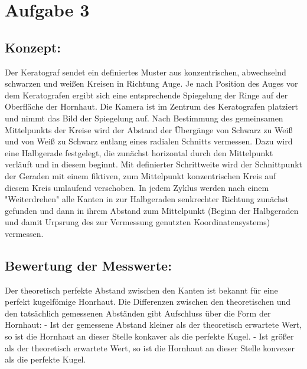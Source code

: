\documentclass{../Vorlage/sebDenCls}
\begin{document}
\section*{Aufgabe 3}

\subsection{Konzept:}
Der Keratograf sendet ein definiertes Muster aus konzentrischen, abwechselnd schwarzen und weißen Kreisen in Richtung Auge. Je nach Position des Auges vor dem Keratografen ergibt sich eine entsprechende Spiegelung der Ringe auf der Oberfläche der Hornhaut. Die Kamera ist im Zentrum des Keratografen platziert und nimmt das Bild der Spiegelung auf. Nach Bestimmung des gemeinsamen Mittelpunkts der Kreise wird der Abstand der Übergänge von Schwarz zu Weiß und von Weiß zu Schwarz entlang eines radialen Schnitts vermessen. Dazu wird eine Halbgerade festgelegt, die zunächst horizontal durch den Mittelpunkt verläuft und in diesem beginnt. Mit definierter Schrittweite wird der Schnittpunkt der Geraden mit einem fiktiven, zum Mittelpunkt konzentrischen Kreis auf diesem Kreis umlaufend verschoben. In jedem Zyklus werden nach einem "Weiterdrehen" alle Kanten in zur Halbgeraden senkrechter Richtung zunächst gefunden und dann in ihrem Abstand zum Mittelpunkt (Beginn der Halbgeraden und damit Urpsrung des zur Vermessung genutzten Koordinatensystems) vermessen. 

\subsection{Bewertung der Messwerte:}
Der theoretisch perfekte Abstand zwischen den Kanten ist bekannt für eine perfekt kugelfömige Honrhaut. Die Differenzen zwischen den theoretischen und den tatsächlich gemessenen Abständen gibt Aufschluss über die Form der Hornhaut: 
- Ist der gemessene Abstand kleiner als der theoretisch erwartete Wert, so ist die Hornhaut an dieser Stelle konkaver als die perfekte Kugel.
- Ist größer als der theoretisch erwartete Wert, so ist die Hornhaut an dieser Stelle konvexer als die perfekte Kugel.
\end{document}
